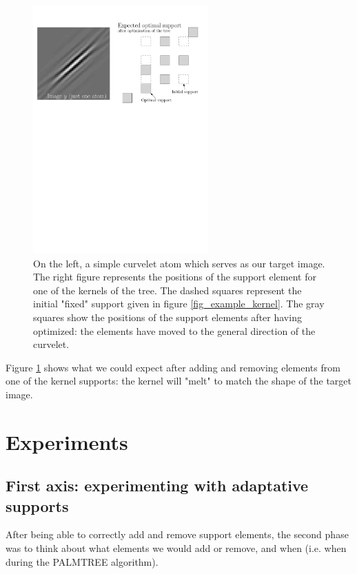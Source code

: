 \begin{figure}[!ht] \centering
\includegraphics[width=0.6\textwidth]{figures/example-optimized-support.pdf}
\caption{On the left, a simple curvelet atom which serves as our target image. The right figure represents the positions of the support element for one of the kernels of the tree. The dashed squares represent the initial "fixed" support given in figure \ref{fig_example_kernel}. The gray squares show the positions of the support elements after having optimized: the elements have moved to the general direction of the curvelet.\label{fig_example_optimal_support}}
\end{figure}

Figure \ref{fig_example_optimal_support} shows what we could expect after adding and removing elements from one of the kernel supports: the kernel will "melt" to match the shape of the target image.


\chapter{Experiments}

\section{First axis: experimenting with adaptative supports}

After being able to correctly add and remove support elements, the second phase was to think about what elements we would add or remove, and when (i.e. when during the PALMTREE algorithm).

